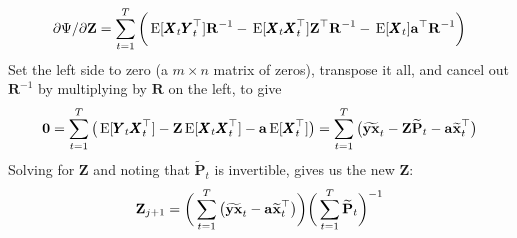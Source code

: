 \documentclass[]{article}
\def\XI{\mbox{\boldmath $\Xi$}}
\def\E{\,\textup{\textrm{E}}}
\def\PP{\mbox{$\mathbf P$}}  \def\pp{\mbox{$\mathbf p$}}
\def\RR{\mbox{$\mathbf R$}}	 \def\rr{\mbox{$\mathbf r$}} \def\Rb{\mbox{$\mathbf H$}}	\def\Rm{\mathbb{R}}
\def\XX{\mbox{$\pmb{X}$}}	\def\xx{\mbox{$\pmb{x}$}}
\def\YY{\mbox{$\pmb{Y}$}}	\def\yy{\mbox{$\pmb{y}$}}
\def\ZZ{\mbox{$\mathbf Z$}}	\def\zz{\mbox{$\mathbf z$}}	\def\Zb{\mbox{$\mathbf M$}} \def\Za{\mbox{$\mathbf N$}} \def\Zm{\XI}
\def\hatxt{\widetilde{\mbox{$\mathbf x$}}_t}
\def\hatYXt{\widetilde{\mbox{$\mathbf{y}\mathbf{x}$}}_t}
\def\hatPt{\widetilde{\PP}_t}
\begin{document}
\begin{equation}\label{eq:Z.unconstrained3}
\begin{split}
&\partial\Psi/\partial\ZZ =  \sum_{t=1}^T\bigg(\E[ \XX_t \YY_t^\top]\RR^{-1} 
- \E[ \XX_t\XX_t^\top ]\ZZ^\top\RR^{-1}  -\E[ \XX_t ]\aa^\top\RR^{-1} \bigg) \\
\end{split}
\end{equation}
Set the left side to zero (a $m \times n$ matrix of zeros), transpose it all, and cancel out $\RR^{-1}$ by multiplying by $\RR$ on the left, to give
\begin{equation}\label{eq:Z.unconstrained4}
\begin{split}
\mathbf{0}  =  \sum_{t=1}^T\big(\E[\YY_t\XX_t^\top] - \ZZ \E[\XX_t\XX_t^\top] - \aa\E[\XX_t^\top]\big) 
 =  \sum_{t=1}^T \big( \hatYXt  - \ZZ \hatPt - \aa\hatxt^\top \big)
\end{split}
\end{equation}
Solving for $\ZZ$ and noting that $\hatPt$ is invertible, gives us the new $\ZZ$: 
\begin{equation}\label{eq:Z.update.unconstrained}
\ZZ_{j+1}= \bigg( \sum_{t=1}^T \big(\hatYXt - \aa\hatxt^\top\big)\bigg) \bigg(\sum_{t=1}^T \hatPt\bigg)^{-1}
\end{equation}
\end{document}
